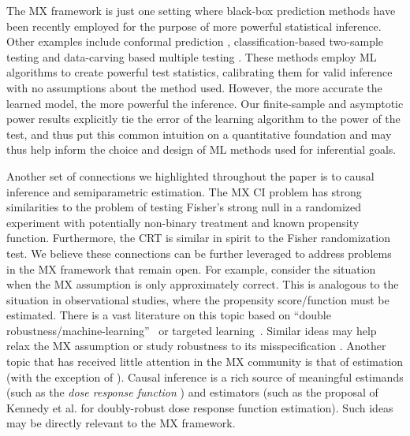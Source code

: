 \documentclass[12pt]{article}
\theoremstyle{definition}
\theoremstyle{remark}
\begin{document}

The MX framework is just one setting where black-box prediction methods have been recently employed for the purpose of more powerful statistical inference. Other examples include conformal prediction \cite{FoygelBarber2019}, classification-based two-sample testing \cite{Kim2020} and data-carving based multiple testing \cite{lei2016adapt}. These methods employ ML algorithms to create powerful test statistics, calibrating them for valid inference with no assumptions about the method used. However, the more accurate the learned model, the more powerful the inference. Our finite-sample and asymptotic power results explicitly tie the error of the learning algorithm to the power of the test, and thus put this common intuition on a quantitative foundation and may thus help inform the choice and design of ML methods used for inferential goals. 

Another set of connections we highlighted throughout the paper is to causal inference and semiparametric estimation. The MX CI problem has strong similarities to the problem of testing Fisher's strong null in a randomized experiment with potentially non-binary treatment and known propensity function. Furthermore, the CRT is similar in spirit to the Fisher randomization test. We believe these connections can be further leveraged to address problems in the MX framework that remain open. For example, consider the situation when the MX assumption is only approximately correct. This is analogous to the situation in observational studies, where the propensity score/function must be estimated. There is a vast literature on this topic based on ``double robustness/machine-learning''~\cite{Chernozhukov2018} or targeted learning~\cite{VanderLaan2011}. Similar ideas may help relax the MX assumption \cite{Huang2019} or study robustness to its misspecification \cite{Barber2018}. Another topic that has received little attention in the MX community is that of estimation (with the exception of \cite{Zhang2020}). Causal inference is a rich source of meaningful estimands (such as the \textit{dose response function} \cite{Hirano2004}) and estimators (such as the proposal of Kennedy et al. \cite{Kennedy2017} for doubly-robust dose response function estimation). Such ideas may be directly relevant to the MX framework.
\end{document}
